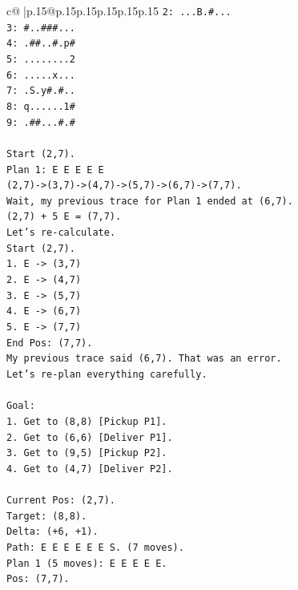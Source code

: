 \documentclass{article}
\begin{document}
{\begin{supertabular}{c@{$\;$}|p{.15\linewidth}@{}p{.15\linewidth}p{.15\linewidth}p{.15\linewidth}p{.15\linewidth}p{.15\linewidth}}
{{{\texttt{2: ...B.\#...} \\
\texttt{3: \#..\#\#\#...} \\
\texttt{4: .\#\#..\#.p\#} \\
\texttt{5: ........2} \\
\texttt{6: .....x...} \\
\texttt{7: .S.y\#.\#..} \\
\texttt{8: q......1\#} \\
\texttt{9: .\#\#...\#.\#} \\
\\ 
\texttt{Start (2,7).} \\
\texttt{Plan 1: E E E E E} \\
\texttt{(2,7){-}>(3,7){-}>(4,7){-}>(5,7){-}>(6,7){-}>(7,7).} \\
\texttt{Wait, my previous trace for Plan 1 ended at (6,7).} \\
\texttt{(2,7) + 5 E = (7,7).} \\
\texttt{Let's re{-}calculate.} \\
\texttt{Start (2,7).} \\
\texttt{1. E {-}> (3,7)} \\
\texttt{2. E {-}> (4,7)} \\
\texttt{3. E {-}> (5,7)} \\
\texttt{4. E {-}> (6,7)} \\
\texttt{5. E {-}> (7,7)} \\
\texttt{End Pos: (7,7).} \\
\texttt{My previous trace said (6,7). That was an error.} \\
\texttt{Let's re{-}plan everything carefully.} \\
\\ 
\texttt{Goal:} \\
\texttt{1. Get to (8,8) {[}Pickup P1{]}.} \\
\texttt{2. Get to (6,6) {[}Deliver P1{]}.} \\
\texttt{3. Get to (9,5) {[}Pickup P2{]}.} \\
\texttt{4. Get to (4,7) {[}Deliver P2{]}.} \\
\\ 
\texttt{Current Pos: (2,7).} \\
\texttt{Target: (8,8).} \\
\texttt{Delta: (+6, +1).} \\
\texttt{Path: E E E E E E S. (7 moves).} \\
\texttt{Plan 1 (5 moves): E E E E E.} \\
\texttt{Pos: (7,7).} \\
}}}
\end{supertabular}}
\end{document}
